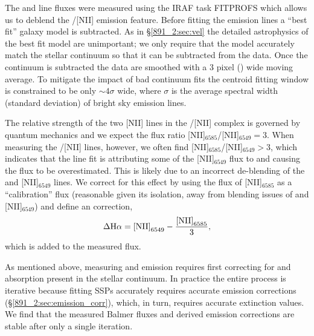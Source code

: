 The \Ha and \HB line fluxes were measured using the IRAF task FITPROFS
which allows us to deblend the \Ha/[NII] emission feature. Before
fitting the emission lines a ``best fit'' galaxy model is
subtracted. As in \S\ref{891_2:sec:vel} the detailed astrophysics of the
best fit model are unimportant; we only require that the model
accurately match the stellar continuum so that it can be subtracted
from the data. Once the continuum is subtracted the data are smoothed
with a 3 pixel () wide moving average. To
mitigate the impact of bad continuum fits the centroid fitting window
is constrained to be only $\sim 4\sigma$ wide, where $\sigma$ is the
average spectral width (standard deviation) of bright sky emission
lines.


The relative strength of the two [NII] lines in the \Ha/[NII] complex
is governed by quantum mechanics and we expect the flux ratio
[NII]$_{6585}$/[NII]$_{6549} = 3$. When measuring the \Ha/[NII] lines,
however, we often find [NII]$_{6585}$/[NII]$_{6549} > 3$, which
indicates that the line fit is attributing some of the [NII]$_{6549}$
flux to \Ha and causing the \Ha flux to be overestimated.  This is
likely due to an incorrect de-blending of the \Ha and [NII]$_{6549}$
lines.  We correct for this effect by using the flux of [NII]$_{6585}$
as a ``calibration'' flux (reasonable given its isolation, away from
blending issues of \Ha and [NII]$_{6549}$) and define an \Ha
correction,
\begin{equation}
  \label{891_2:eq:balmer_corr}
  \Delta\mathrm{H}\alpha = \mathrm{[NII]}_{6549} - \frac{\mathrm{[NII]}_{6585}}{3},
\end{equation}
which is added to the measured \Ha flux.

As mentioned above, measuring \Ha and \HB emission requires first correcting
for \Ha and \HB absorption present in the stellar continuum. In practice the
entire process is iterative because fitting SSPs accurately requires accurate
emission corrections (\S\ref{891_2:sec:emission_corr}), which, in turn, requires
accurate extinction values. We find that the measured Balmer fluxes
and derived emission corrections are stable after only a single
iteration.

